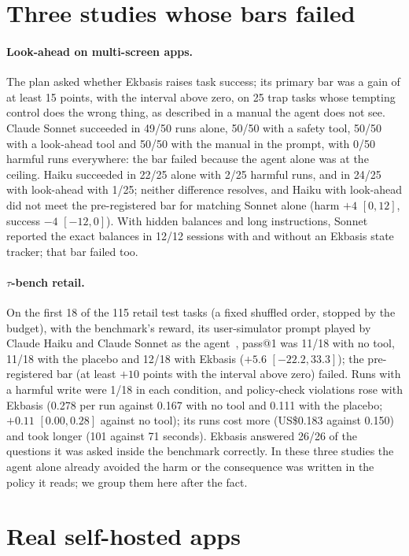 \documentclass[11pt]{article}
\begin{document}
\section{Three studies whose bars failed}\label{sec:visible}
\paragraph{Look-ahead on multi-screen apps.} The plan asked whether Ekbasis raises task success; its primary bar was a
gain of at least 15 points, with the interval above zero, on 25 trap tasks whose tempting control does the wrong thing,
as described in a manual the agent does not see. Claude Sonnet succeeded in 49/50 runs alone, 50/50 with a safety tool,
50/50 with a look-ahead tool and 50/50 with the manual in the prompt, with 0/50 harmful runs everywhere: the bar failed
because the agent alone was at the ceiling. Haiku succeeded in 22/25 alone with 2/25 harmful runs, and in 24/25 with
look-ahead with 1/25; neither difference resolves, and Haiku with look-ahead did not meet the pre-registered bar for
matching Sonnet alone (harm $+4$ $[0, 12]$, success $-4$ $[-12, 0]$). With hidden balances and long instructions, Sonnet
reported the exact balances in 12/12 sessions with and without an Ekbasis state tracker; that bar failed too.

\paragraph{$\tau$-bench retail.} On the first 18 of the 115 retail test tasks (a fixed shuffled order, stopped by the
budget), with the benchmark's reward, its user-simulator prompt played by Claude Haiku and Claude Sonnet as the
agent~\cite{yao2024tau}, pass@1 was 11/18 with no tool, 11/18 with the placebo and 12/18 with Ekbasis ($+5.6$
$[-22.2, 33.3]$); the pre-registered bar (at least $+10$ points with the interval above zero) failed. Runs with a harmful
write were 1/18 in each condition, and policy-check violations rose with Ekbasis (0.278 per run against 0.167 with no
tool and 0.111 with the placebo; $+0.11$ $[0.00, 0.28]$ against no tool); its runs cost more (US\$0.183 against 0.150)
and took longer (101 against 71 seconds). Ekbasis answered 26/26 of the questions it was asked inside the benchmark
correctly. In these three studies the agent alone already avoided the harm or the consequence was written in the policy
it reads; we group them here after the fact.

\section{Real self-hosted apps}\label{sec:realapps}
\end{document}
